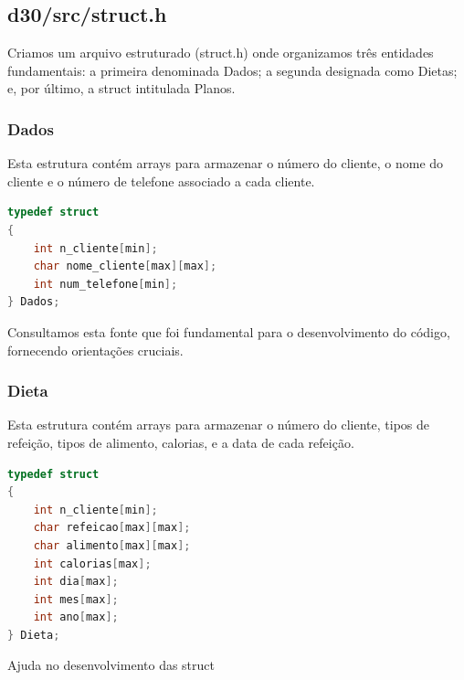 \documentclass[a4wide]{report}
\begin{document}
\subsection{d30/src/struct.h}
Criamos um arquivo estruturado (struct.h) onde organizamos três entidades fundamentais: a primeira denominada Dados; a segunda designada como Dietas; e, por último, a struct intitulada Planos.
\subsubsection{Dados }
Esta estrutura contém arrays para armazenar o número do cliente, o nome do cliente e o número de telefone associado a cada cliente.
\\
\begin{lstlisting}[xleftmargin=7em, xrightmargin=7em,language=C, caption={Struct Dados}, label={codigo:c}]
typedef struct
{
    int n_cliente[min];
    char nome_cliente[max][max];
    int num_telefone[min];
} Dados;
\end{lstlisting}
\cite{geeksforgeeks_structures} Consultamos esta fonte que foi fundamental para o desenvolvimento do código, fornecendo orientações cruciais. 
\subsubsection{Dieta}
Esta estrutura contém arrays para armazenar o número do cliente, tipos de refeição, tipos de alimento, calorias, e a data de cada refeição.
\\
\begin{lstlisting}[xleftmargin=7em, xrightmargin=7em,language=C, caption={Struct Dieta}, label={codigo:c}]
typedef struct
{
    int n_cliente[min];
    char refeicao[max][max];
    char alimento[max][max];
    int calorias[max];
    int dia[max];
    int mes[max];
    int ano[max];
} Dieta;
\end{lstlisting}
\cite{geeksforgeeks_structures}Ajuda no desenvolvimento das struct
\end{document}
